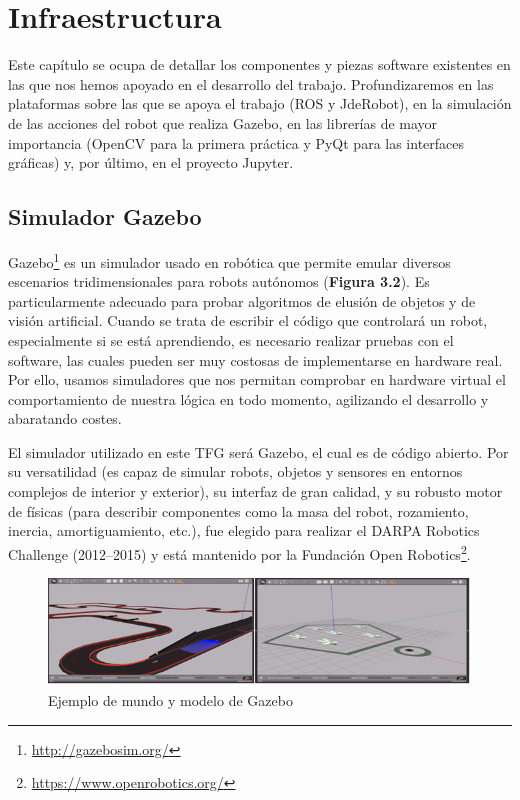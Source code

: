 \chapter{Infraestructura}\label{cap.infraestructura}
Este capítulo se ocupa de detallar  los componentes y piezas software existentes en las que nos hemos apoyado en el desarrollo del trabajo. Profundizaremos en las plataformas sobre las que se apoya el trabajo (ROS y JdeRobot), en la simulación de las acciones del robot que realiza Gazebo, en las librerías de mayor importancia (OpenCV para la primera práctica y PyQt para las interfaces gráficas) y, por último, en el proyecto Jupyter.

\section{Simulador Gazebo}
Gazebo\footnote{\url{http://gazebosim.org/}} es un simulador usado en robótica que permite emular diversos escenarios tridimensionales para robots autónomos (\textbf{Figura 3.2}). Es particularmente adecuado para probar algoritmos de elusión de objetos y de visión artificial. Cuando se trata de escribir el código que controlará un robot, especialmente si se está aprendiendo, es necesario realizar pruebas con el software, las cuales pueden ser muy costosas de implementarse en hardware real. Por ello, usamos simuladores que nos permitan comprobar en hardware virtual el comportamiento de nuestra lógica en todo momento, agilizando el desarrollo y abaratando costes. 

El simulador utilizado en este TFG será Gazebo, el cual es de código abierto. Por su versatilidad (es capaz de simular robots, objetos y sensores en entornos complejos de interior y exterior), su interfaz de gran calidad, y su robusto motor de físicas (para describir componentes como la masa del robot, rozamiento, inercia, amortiguamiento, etc.), fue elegido para realizar el DARPA Robotics Challenge (2012–2015) y está mantenido por la Fundación Open Robotics\footnote{\url{https://www.openrobotics.org/}}.

\begin{figure}[H]
  \begin{center}
    \includegraphics[width=0.9\linewidth]{figures/gazeboworlds.png}
		\caption{Ejemplo de mundo y modelo de Gazebo}
		\label{fig.worlds}
		\end{center}
\end{figure}

